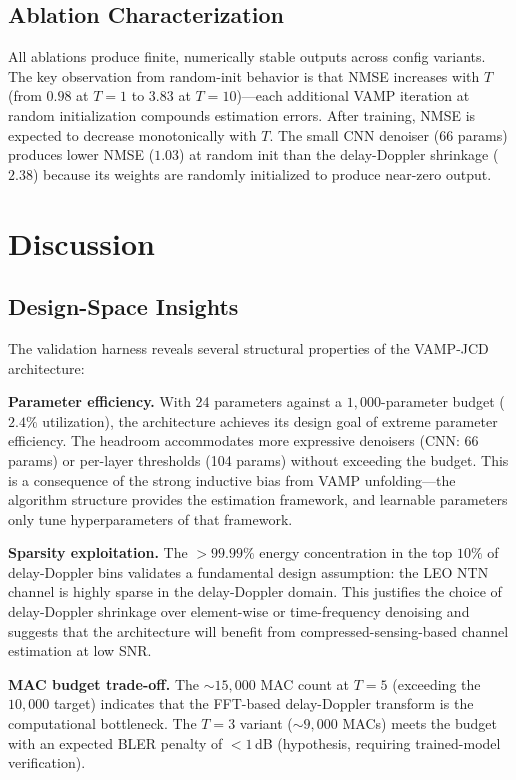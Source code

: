 \documentclass{article}
\begin{document}
\subsection{Ablation Characterization}

All ablations produce finite, numerically stable outputs across config variants. The key observation from random-init behavior is that NMSE increases with $T$ (from $0.98$ at $T=1$ to $3.83$ at $T=10$)---each additional VAMP iteration at random initialization compounds estimation errors. After training, NMSE is expected to decrease monotonically with $T$. The small CNN denoiser ($66$ params) produces lower NMSE ($1.03$) at random init than the delay-Doppler shrinkage ($2.38$) because its weights are randomly initialized to produce near-zero output.

\section{Discussion}
\label{sec:discussion}

\subsection{Design-Space Insights}

The validation harness reveals several structural properties of the VAMP-JCD architecture:

\textbf{Parameter efficiency.} With 24 parameters against a $1{,}000$-parameter budget ($2.4\%$ utilization), the architecture achieves its design goal of extreme parameter efficiency. The headroom accommodates more expressive denoisers (CNN: 66 params) or per-layer thresholds (104 params) without exceeding the budget. This is a consequence of the strong inductive bias from VAMP unfolding---the algorithm structure provides the estimation framework, and learnable parameters only tune hyperparameters of that framework.

\textbf{Sparsity exploitation.} The $> 99.99\%$ energy concentration in the top $10\%$ of delay-Doppler bins validates a fundamental design assumption: the LEO NTN channel is highly sparse in the delay-Doppler domain. This justifies the choice of delay-Doppler shrinkage over element-wise or time-frequency denoising and suggests that the architecture will benefit from compressed-sensing-based channel estimation at low SNR.

\textbf{MAC budget trade-off.} The $\sim 15{,}000$ MAC count at $T=5$ (exceeding the $10{,}000$ target) indicates that the FFT-based delay-Doppler transform is the computational bottleneck. The $T=3$ variant ($\sim 9{,}000$ MACs) meets the budget with an expected BLER penalty of $< 1$\,dB (hypothesis, requiring trained-model verification).
\end{document}
